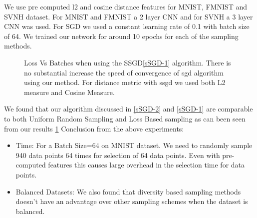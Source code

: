\documentclass[a4paper,twoside]{iiththesis}
\theoremstyle{definition}
\theoremstyle{definition}
\theoremstyle{remark}
\begin{document}
We use pre computed l2 and cosine distance features for MNIST, FMNIST and SVNH dataset. For MNIST and FMNIST a 2 layer CNN and for SVNH a 3 layer CNN was used. For SGD we used a constant learning rate of 0.1 with batch size of 64. We trained our network for around 10 epochs for each of the sampling methods.
\begin{figure}[H]
    \caption{Loss Vs Batches when using the SSGD\ref{sSGD-1} algorithm. There is no substantial  increase the speed of convergence of sgd algorithm using our method. For distance metric with ssgd we used both L2 measure and Cosine Measure.}
    \label{res-1}%
\end{figure}
\vspace{1.9pt}
We found that our algorithm discussed in \ref{sSGD-2} and \ref{sSGD-1} are comparable to both Uniform Random Sampling and Loss Based sampling as can been seen from our results \ref{res-1}
Conclusion from the above experiments:
\begin{itemize}
\item Time: For a Batch Size=64 on MNIST dataset. We need to randomly sample  940 data points 64 times for selection of 64 data points. Even with pre-computed features this causes large overhead in the selection time for data points.
\item Balanced Datasets: We also found that diversity based sampling methods doesn't have an advantage over other sampling schemes when the dataset is balanced.
\end{itemize}
\end{document}
